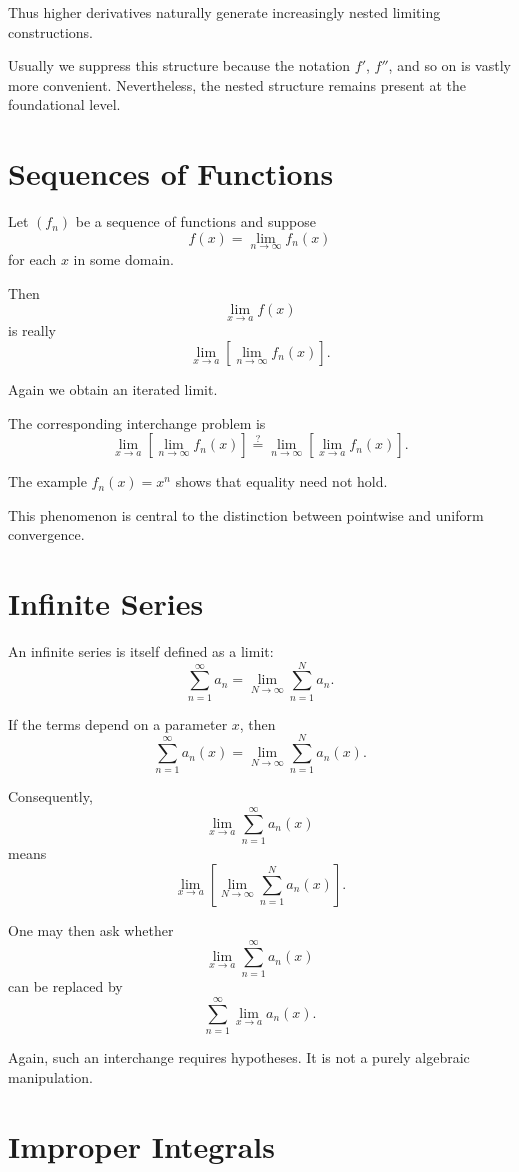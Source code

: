 \documentclass{essay}
\begin{document}
Thus higher derivatives naturally generate increasingly nested limiting constructions.

Usually we suppress this structure because the notation \(f'\), \(f''\), and so on is vastly more convenient. Nevertheless, the nested structure remains present at the foundational level.

\section{Sequences of Functions}

Let \((f_{n})\) be a sequence of functions and suppose
\[ f(x) = \lim_{n\to\infty}f_{n}(x) \]
for each \(x\) in some domain.

Then
\[ \lim_{x\to a}f(x) \]
is really
\[ \lim_{x\to a} \left[ \lim_{n\to\infty}f_{n}(x) \right]. \]

Again we obtain an iterated limit.

The corresponding interchange problem is
\[ \lim_{x\to a} \left[ \lim_{n\to\infty}f_{n}(x) \right] \stackrel{?}{=} \lim_{n\to\infty} \left[ \lim_{x\to a}f_{n}(x) \right]. \]

The example \(f_{n}(x)=x^{n}\) shows that equality need not hold.

This phenomenon is central to the distinction between pointwise and uniform convergence.

\section{Infinite Series}

An infinite series is itself defined as a limit:
\[ \sum_{n=1}^{\infty}a_{n} = \lim_{N\to\infty} \sum_{n=1}^{N}a_{n}. \]

If the terms depend on a parameter \(x\), then
\[ \sum_{n=1}^{\infty}a_{n}(x) = \lim_{N\to\infty} \sum_{n=1}^{N}a_{n}(x). \]

Consequently,
\[ \lim_{x\to a} \sum_{n=1}^{\infty}a_{n}(x) \]
means
\[ \lim_{x\to a} \left[ \lim_{N\to\infty} \sum_{n=1}^{N}a_{n}(x) \right]. \]

One may then ask whether
\[ \lim_{x\to a} \sum_{n=1}^{\infty}a_{n}(x) \]
can be replaced by
\[ \sum_{n=1}^{\infty} \lim_{x\to a}a_{n}(x). \]

Again, such an interchange requires hypotheses. It is not a purely algebraic manipulation.

\section{Improper Integrals}
\end{document}
